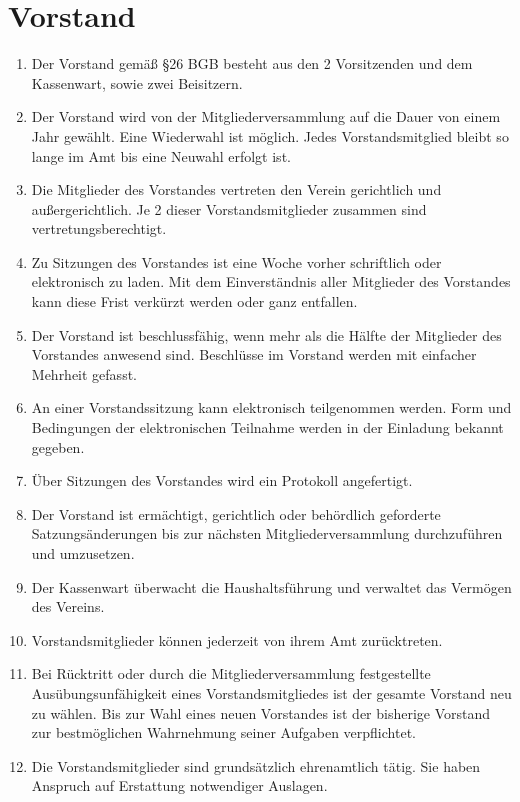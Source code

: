 \documentclass[ngerman]{article}
\begin{document}
\section{Vorstand}
\begin{enumerate}
  \item Der Vorstand gemäß §26 BGB besteht aus den 2 Vorsitzenden und dem Kassenwart, sowie zwei Beisitzern.
  \item Der Vorstand wird von der Mitgliederversammlung auf die Dauer von einem Jahr gewählt. Eine Wiederwahl ist möglich. Jedes Vorstandsmitglied bleibt so lange im Amt bis eine Neuwahl erfolgt ist.
  \item Die Mitglieder des Vorstandes vertreten den Verein gerichtlich und außergerichtlich. Je 2 dieser Vorstandsmitglieder zusammen sind vertretungsberechtigt.
  \item Zu Sitzungen des Vorstandes ist eine Woche vorher schriftlich oder elektronisch zu laden. Mit dem Einverständnis aller Mitglieder des Vorstandes kann diese Frist verkürzt werden oder ganz entfallen.
  \item Der Vorstand ist beschlussfähig, wenn mehr als die Hälfte der Mitglieder des Vorstandes anwesend sind. Beschlüsse im Vorstand werden mit einfacher Mehrheit gefasst.
  \item An einer Vorstandssitzung kann elektronisch teilgenommen werden. Form und Bedingungen der elektronischen Teilnahme werden in der Einladung bekannt gegeben.
  \item Über Sitzungen des Vorstandes wird ein Protokoll angefertigt.
  \item Der Vorstand ist ermächtigt, gerichtlich oder behördlich geforderte Satzungsänderungen bis zur nächsten Mitgliederversammlung durchzuführen und umzusetzen.
  \item Der Kassenwart überwacht die Haushaltsführung und verwaltet das Vermögen des Vereins.
  \item Vorstandsmitglieder können jederzeit von ihrem Amt zurücktreten.
  \item Bei Rücktritt oder durch die Mitgliederversammlung festgestellte Ausübungsunfähigkeit eines Vorstandsmitgliedes ist der gesamte Vorstand neu zu wählen. Bis zur Wahl eines neuen Vorstandes ist der bisherige Vorstand zur bestmöglichen Wahrnehmung seiner Aufgaben verpflichtet.
  \item Die Vorstandsmitglieder sind grundsätzlich ehrenamtlich tätig. Sie haben Anspruch auf Erstattung notwendiger Auslagen.
\end{enumerate}
\end{document}
